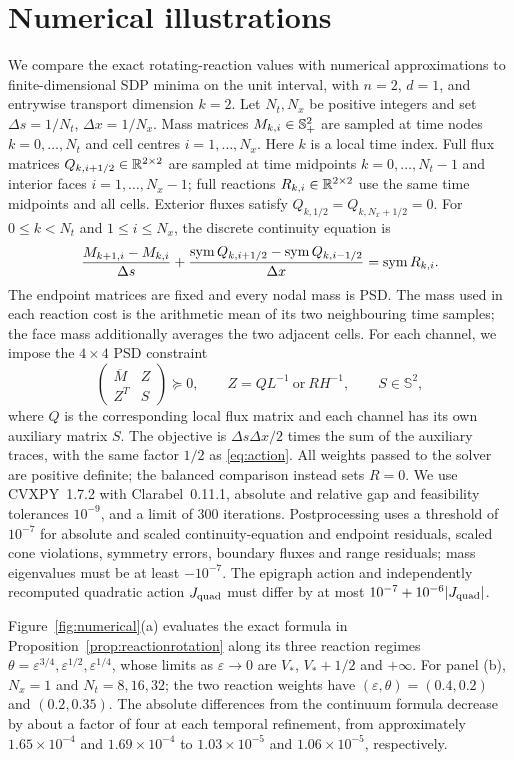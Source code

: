 \section{Numerical illustrations}\label{sec:numerical}
We compare the exact rotating-reaction values with numerical approximations
to finite-dimensional SDP minima on the unit interval, with $n=2$, $d=1$,
and entrywise transport dimension $k=2$. Let $N_t,N_x$ be positive integers
and set $\Delta s=1/N_t$, $\Delta x=1/N_x$.
Mass matrices $M_{k,i}\in\mathbb S_+^2$ are sampled at time nodes $k=0,\ldots,N_t$
and cell centres $i=1,\ldots,N_x$. Here $k$ is a local time index.
Full flux matrices $Q_{k,i+1/2}\in\mathbb R^{2\times2}$ are sampled at time
midpoints $k=0,\ldots,N_t-1$ and interior faces $i=1,\ldots,N_x-1$;
full reactions $R_{k,i}\in\mathbb R^{2\times2}$ use the same time midpoints and
all cells. Exterior fluxes satisfy $Q_{k,1/2}=Q_{k,N_x+1/2}=0$.
For $0\le k<N_t$ and $1\le i\le N_x$, the discrete continuity equation is
\[
 \frac{M_{k+1,i}-M_{k,i}}{\Delta s}
 +\frac{\operatorname{sym} Q_{k,i+1/2}-\operatorname{sym} Q_{k,i-1/2}}{\Delta x}
 =\operatorname{sym} R_{k,i}.
\]
The endpoint matrices are fixed and every nodal mass is PSD.
The mass used in each reaction cost is the arithmetic mean of its two
neighbouring time samples; the face mass additionally averages the two
adjacent cells. For each channel, we impose the $4\times4$ PSD constraint
\[
 \begin{pmatrix}\overline M&Z\\Z^T&S\end{pmatrix}\succeq0,
 \qquad Z=QL^{-1}\ \text{or}\ RH^{-1},\qquad S\in\mathbb S^2,
\]
where $Q$ is the corresponding local flux matrix and each channel has
its own auxiliary matrix $S$.
The objective is $\Delta s\Delta x/2$ times the sum of the auxiliary traces,
with the same factor $1/2$ as \eqref{eq:action}. All weights passed to the
solver are positive definite; the balanced comparison instead sets $R=0$.
We use CVXPY~1.7.2 with Clarabel~0.11.1, absolute and relative gap and
feasibility tolerances $10^{-9}$, and a limit of 300 iterations.
Postprocessing uses a threshold of $10^{-7}$ for absolute and scaled
continuity-equation and endpoint residuals, scaled cone violations,
symmetry errors, boundary fluxes and range residuals; mass eigenvalues
must be at least $-10^{-7}$. The epigraph action and independently
recomputed quadratic action $J_{\rm quad}$ must differ by at most
$10^{-7}+10^{-6}|J_{\rm quad}|$.

Figure~\ref{fig:numerical}(a) evaluates the exact formula in
Proposition~\ref{prop:reactionrotation} along its three reaction regimes
$\theta=\varepsilon^{3/4},\varepsilon^{1/2},\varepsilon^{1/4}$, whose limits
as $\varepsilon\to0$ are $V_*$, $V_*+1/2$ and $+\infty$.
For panel (b), $N_x=1$ and $N_t=8,16,32$; the two reaction weights have
$(\varepsilon,\theta)=(0.4,0.2)$ and $(0.2,0.35)$.
The absolute differences from the continuum formula decrease by about a
factor of four at each temporal refinement, from approximately
$1.65\times10^{-4}$ and $1.69\times10^{-4}$ to
$1.03\times10^{-5}$ and $1.06\times10^{-5}$, respectively.

